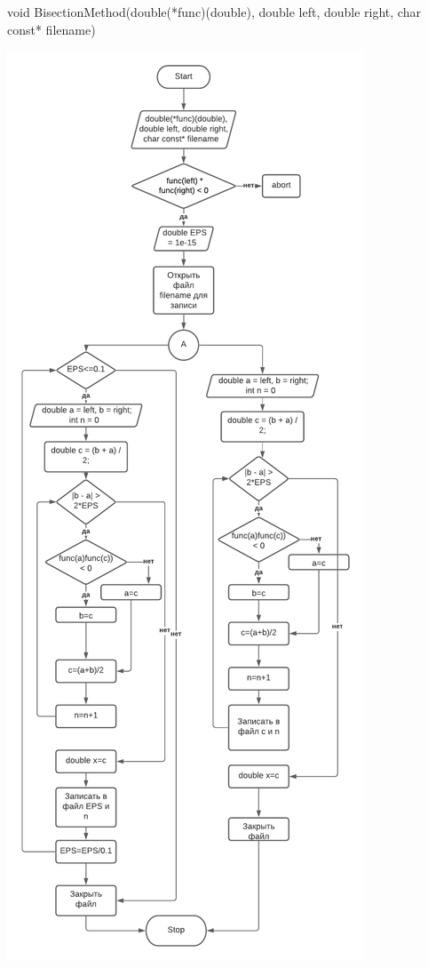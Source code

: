 void BisectionMethod(double(*func)(double), double left, double right, char const* filename)

\includegraphics[scale=0.5]{block3.pdf}


